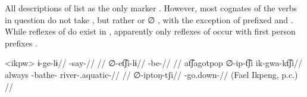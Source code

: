 

All descriptions of \ikpeng list  as the only  marker \parencites[55]{ikpengpacheco1997}[105]{campetela1997analise}[64]{ikpengpacheco2001}[205]{chagas2013verbo}.
However, most \ikpeng cognates of the verbs in question do not take , but rather  or ∅ , with the exception of prefixed  and  .
While reflexes of   do exist in \ikpeng, apparently only reflexes of   occur with first person prefixes \parencite[401]{gildea2018reconstructing}.

\pex<ikpw>\ikpeng
{}
\begingl
\gla ɨ-ge-lɨ//
\glb {}-say-//
\glft {} \parencite[][209]{ikpengpacheco2001}//
\endgl
{}
\begingl
\gla ∅-et͡ʃi-lɨ//
\glb {}-be-//
\glft {} \parencite[][139]{ikpengpacheco2001}//
\endgl
{}
\begingl
\gla at͡ʃagotpop ∅-ip-t͡ʃi ik-gwa-kt͡ʃi//
\glb always -bathe- river-.aquatic-//
\glft {} \parencite[][68]{ikpengpacheco1997}//
\endgl
{}
\begingl
\gla ∅-iptoŋ-tʃi//
\glb {}-go.down-//
\glft {} (Fael Ikpeng, p.c.) //
\endgl
\xe

